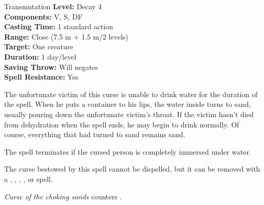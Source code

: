{Transmutation}
{
	\textbf{Level:}
	Decay 4\\
	\textbf{Components:}
	V, S, DF\\
	\textbf{Casting Time:}
	1 standard action\\
	\textbf{Range:}
	Close (7.5 m + 1.5 m/2 levels)\\
	\textbf{Target:}
	One creature\\
	\textbf{Duration:}
	1 day/level\\
	\textbf{Saving Throw:}
	Will negates\\
	\textbf{Spell Resistance:}
	Yes\\
}
{
	The unfortunate victim of this curse is unable to drink water for the duration of the spell. When he puts a container to his lips, the water inside turns to sand, usually pouring down the unfortunate victim's throat. If the victim hasn't died from dehydration when the spell ends, he may begin to drink normally. Of course, everything that had turned to sand remains sand.

	The spell terminates if the cursed person is completely immersed under water. 

	The curse bestowed by this spell cannot be dispelled, but it can be removed with a , , , , or  spell.

	\emph{Curse of the choking sands} counters .
}
